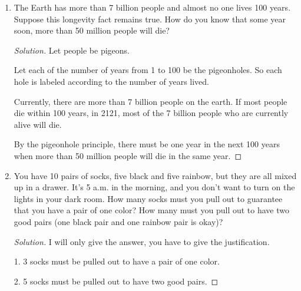 \documentclass[12pt]{amsart}
\begin{document}
\begin{enumerate}[label=\arabic*.,itemsep=10pt, leftmargin=*]
\begin{proof}[Solution]
   We have then picked $6$ pigeons for $5$ pigeonholes.


   By the pigeonhole principle, one hole must have 2 members. That hole cannot be
   $\set{7}$ as it only has 1 member.
   The other holes contain the property that given two numbers belonging to the set,
    one must be a multiple of the other.
\end{proof}

 \item 
 The Earth has more than 7 billion people and almost no one lives 100 years. Suppose this longevity fact remains true. How do you know that some year soon, more than 50 million people will die? 

\begin{proof}[Solution]
   Let people be pigeons. 

   Let each of the number of years from 1 to 100 be the pigeonholes. 
    So each hole is labeled according to the number of years lived.

    Currently, there are more than 7 billion people on the earth. If most people
    die within 100 years, in 2121, most of the 7 billion people who are currently alive
    will die.

    By the pigeonhole principle, there must be one year in the next 100 years when
    more than 50 million people will die in the same year.
\end{proof}


 \item  You have 10 pairs of socks, five black and five rainbow, 
but they are all mixed up in a drawer. 
It's 5 a.m. in the morning, and you don't want to turn on the lights in your dark room. 
How many socks must you pull out to guarantee that you have a pair of one color? How many must you pull out to have two good pairs (one black pair and one rainbow pair is okay)?

\begin{proof}[Solution]
    I will only give the answer, you have to give the justification.

    1. 3 socks must be pulled out to have a pair of one color.

    2. 5 socks must be pulled  out to have two good pairs.
\end{proof}



\end{enumerate}




%
%
\end{document}
